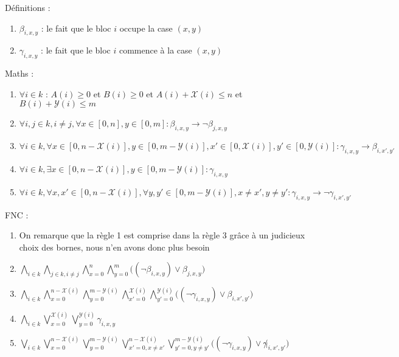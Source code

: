 \documentclass[a4paper]{article}
\begin{document}
Définitions :
\begin{enumerate}
  \item $\beta_{i, x, y}$ : le fait que le bloc $i$ occupe la case $(x,y)$
  \item $\gamma_{i, x, y}$ : le fait que le bloc $i$ commence à la case $(x,y)$
\end{enumerate}

Maths :
\begin{enumerate}
  \item $\forall i \in k$ : $A(i) \geq 0$ et $B(i) \geq 0$ et $A(i) + \mathcal{X}(i) \leq n$ et $B(i) + \mathcal{Y}(i)\leq m$

  \item $\forall i,j \in k, i \neq j, \forall x \in [0,n], y \in [0,m] : \beta_{i, x, y} \rightarrow \lnot \beta_{j, x, y}$

  \item $
  \forall i \in k,
  \forall x \in [0, n - \mathcal{X}(i)] , y \in [0, m - \mathcal{Y}(i)],
    x' \in [0, \mathcal{X}(i)], y' \in [0, \mathcal{Y}(i)] : \gamma_{i, x, y} \rightarrow \beta_{i, x', y'}
  $

  \item $\forall i \in k, \exists x \in  [0, n - \mathcal{X}(i)], y \in [0, m - \mathcal{Y}(i)] : \gamma_{i, x, y}$
  \item $
  \forall i \in k,
  \forall x,x' \in [0, n - \mathcal{X}(i)],
  \forall y,y' \in [0, m - \mathcal{Y}(i)],
  x \neq x', y \neq y' :
  \gamma_{i, x, y} \rightarrow \lnot \gamma_{i, x', y'}
  $
\end{enumerate}



FNC :
\begin{enumerate}
  \item On remarque que la règle 1 est comprise dans la règle 3 grâce à un judicieux choix des bornes, nous n'en avons donc plus besoin

  \item $
  \bigwedge_{i \in k} \bigwedge_{j \in k, i \neq j} \bigwedge_{x=0}^{n} \bigwedge_{y=0}^{m}
  \Big( (\lnot \beta_{i, x, y}) \lor \beta_{j, x, y} \Big)
  $

  \item $
  \bigwedge_{i \in k}
  \bigwedge_{x=0}^{n - \mathcal{X}(i)} \bigwedge_{y=0}^{m - \mathcal{Y}(i)}
  \bigwedge_{x'=0}^{\mathcal{X}(i)} \bigwedge_{y'=0}^{\mathcal{Y}(i)}
  \Big( (\lnot \gamma_{i, x, y}) \lor \beta_{i, x', y'} \Big)
  $

  \item $
  \bigwedge_{i \in k} \bigvee_{x=0}^{\mathcal{X}(i)} \bigvee_{y=0}^{\mathcal{Y}(i)} \gamma_{i, x, y}
  $

  \item $
  \bigvee_{i \in k}
  \bigvee_{x=0}^{n - \mathcal{X}(i)} \bigvee_{y=0}^{m - \mathcal{Y}(i)}
  \bigvee_{x'=0, x\neq x'}^{n - \mathcal{X}(i)} \bigvee_{y'=0, y\neq y'}^{m - \mathcal{Y}(i)}
  \Big( (\lnot \gamma_{i, x, y}) \lor \not \gamma_{i, x', y'} \Big)
  $
\end{enumerate}
\end{document}
